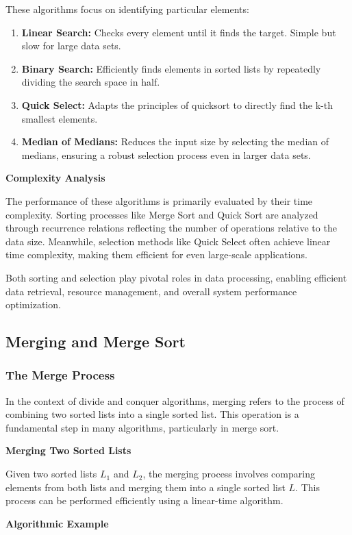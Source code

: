 \documentclass[12pt]{book} %
\begin{document}
These algorithms focus on identifying particular elements:
\begin{enumerate}
    \item \textbf{Linear Search:} Checks every element until it finds the target. Simple but slow for large data sets.
    \item \textbf{Binary Search:} Efficiently finds elements in sorted lists by repeatedly dividing the search space in half.
    \item \textbf{Quick Select:} Adapts the principles of quicksort to directly find the k-th smallest elements.
    \item \textbf{Median of Medians:} Reduces the input size by selecting the median of medians, ensuring a robust selection process even in larger data sets.
\end{enumerate}

\textbf{Complexity Analysis}

The performance of these algorithms is primarily evaluated by their time complexity. Sorting processes like Merge Sort and Quick Sort are analyzed through recurrence relations reflecting the number of operations relative to the data size. Meanwhile, selection methods like Quick Select often achieve linear time complexity, making them efficient for even large-scale applications.

Both sorting and selection play pivotal roles in data processing, enabling efficient data retrieval, resource management, and overall system performance optimization.


\subsection{Merging and Merge Sort}
\subsubsection{The Merge Process}
In the context of divide and conquer algorithms, merging refers to the process of combining two sorted lists into a single sorted list. This operation is a fundamental step in many algorithms, particularly in merge sort.

\textbf{Merging Two Sorted Lists}

Given two sorted lists \( L_1 \) and \( L_2 \), the merging process involves comparing elements from both lists and merging them into a single sorted list \( L \). This process can be performed efficiently using a linear-time algorithm.

\textbf{Algorithmic Example}
\end{document}
